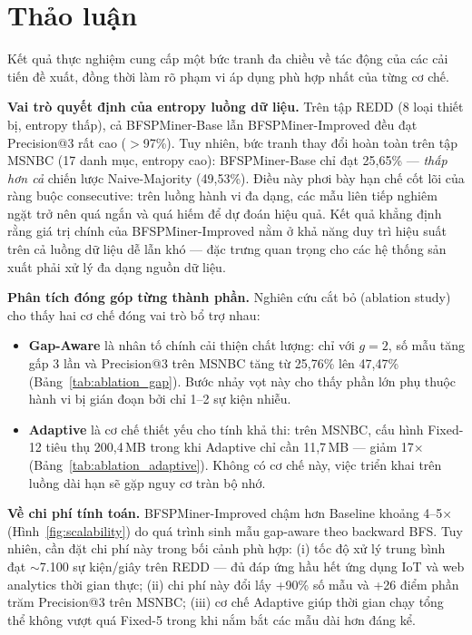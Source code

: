 \documentclass[conference]{IEEEtran}
\begin{document}
\section{Thảo luận}
\label{sec:discussion}

Kết quả thực nghiệm cung cấp một bức tranh đa chiều về tác động của các cải tiến đề xuất, đồng thời làm rõ phạm vi áp dụng phù hợp nhất của từng cơ chế.

\textbf{Vai trò quyết định của entropy luồng dữ liệu.} Trên tập REDD (8 loại thiết bị, entropy thấp), cả BFSPMiner-Base lẫn BFSPMiner-Improved đều đạt Precision@3 rất cao ($>$97\%). Tuy nhiên, bức tranh thay đổi hoàn toàn trên tập MSNBC (17 danh mục, entropy cao): BFSPMiner-Base chỉ đạt 25,65\% --- \textit{thấp hơn cả} chiến lược Naive-Majority (49,53\%). Điều này phơi bày hạn chế cốt lõi của ràng buộc consecutive: trên luồng hành vi đa dạng, các mẫu liên tiếp nghiêm ngặt trở nên quá ngắn và quá hiếm để dự đoán hiệu quả. Kết quả khẳng định rằng giá trị chính của BFSPMiner-Improved nằm ở khả năng duy trì hiệu suất trên cả luồng dữ liệu dễ lẫn khó --- đặc trưng quan trọng cho các hệ thống sản xuất phải xử lý đa dạng nguồn dữ liệu.

\textbf{Phân tích đóng góp từng thành phần.} Nghiên cứu cắt bỏ (ablation study) cho thấy hai cơ chế đóng vai trò bổ trợ nhau:
\begin{itemize}
    \item \textbf{Gap-Aware} là nhân tố chính cải thiện chất lượng: chỉ với $g = 2$, số mẫu tăng gấp 3 lần và Precision@3 trên MSNBC tăng từ 25,76\% lên 47,47\% (Bảng~\ref{tab:ablation_gap}). Bước nhảy vọt này cho thấy phần lớn phụ thuộc hành vi bị gián đoạn bởi chỉ 1--2 sự kiện nhiễu.
    \item \textbf{Adaptive} là cơ chế thiết yếu cho tính khả thi: trên MSNBC, cấu hình Fixed-12 tiêu thụ 200,4\,MB trong khi Adaptive chỉ cần 11,7\,MB --- giảm 17$\times$ (Bảng~\ref{tab:ablation_adaptive}). Không có cơ chế này, việc triển khai trên luồng dài hạn sẽ gặp nguy cơ tràn bộ nhớ.
\end{itemize}

\textbf{Về chi phí tính toán.} BFSPMiner-Improved chậm hơn Baseline khoảng 4--5$\times$ (Hình~\ref{fig:scalability}) do quá trình sinh mẫu gap-aware theo backward BFS. Tuy nhiên, cần đặt chi phí này trong bối cảnh phù hợp: (i) tốc độ xử lý trung bình đạt $\sim$7.100 sự kiện/giây trên REDD --- đủ đáp ứng hầu hết ứng dụng IoT và web analytics thời gian thực; (ii) chi phí này đổi lấy +90\% số mẫu và +26 điểm phần trăm Precision@3 trên MSNBC; (iii) cơ chế Adaptive giúp thời gian chạy tổng thể không vượt quá Fixed-5 trong khi nắm bắt các mẫu dài hơn đáng kể.
\end{document}
